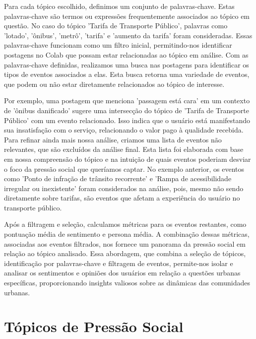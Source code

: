 Para cada tópico escolhido, definimos um conjunto de palavras-chave. Estas palavras-chave são termos ou expressões frequentemente associados ao tópico em questão. No caso do tópico 'Tarifa de Transporte Público', palavras como 'lotado', 'ônibus', 'metrô', 'tarifa' e 'aumento da tarifa' foram consideradas. Essas palavras-chave funcionam como um filtro inicial, permitindo-nos identificar postagens no Colab que possam estar relacionadas ao tópico em análise. Com as palavras-chave definidas, realizamos uma busca nas postagens para identificar os tipos de eventos associados a elas. Esta busca retorna uma variedade de eventos, que podem ou não estar diretamente relacionados ao tópico de interesse.

Por exemplo, uma postagem que menciona 'passagem está cara' em um contexto de 'ônibus danificado' sugere uma intersecção do tópico de 'Tarifa de Transporte Público' com um evento relacionado. Isso indica que o usuário está manifestando sua insatisfação com o serviço, relacionando o valor pago à qualidade recebida. Para refinar ainda mais nossa análise, criamos uma lista de eventos não relevantes, que são excluídos da análise final. Esta lista foi elaborada com base em nossa compreensão do tópico e na intuição de quais eventos poderiam desviar o foco da pressão social que queríamos captar. No exemplo anterior, os eventos como 'Ponto de infração de trânsito recorrente' e 'Rampa de acessibilidade irregular ou inexistente' foram considerados na análise, pois, mesmo não sendo diretamente sobre tarifas, são eventos que afetam a experiência do usuário no transporte público.

Após a filtragem e seleção, calculamos métricas para os eventos restantes, como pontuação média de sentimento e persona média. A combinação dessas métricas, associadas aos eventos filtrados, nos fornece um panorama da pressão social em relação ao tópico analisado. Essa abordagem, que combina a seleção de tópicos, identificação por palavras-chave e filtragem de eventos, permite-nos isolar e analisar os sentimentos e opiniões dos usuários em relação a questões urbanas específicas, proporcionando insights valiosos sobre as dinâmicas das comunidades urbanas.

\section{Tópicos de Pressão Social}

